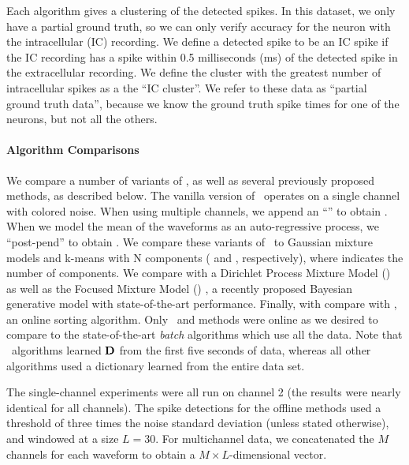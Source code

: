 Each algorithm gives a clustering of the detected spikes.  In this dataset, we only have a partial ground truth, so we can only verify accuracy for the neuron with the intracellular (IC) recording.  We define a detected spike to be an IC spike if the IC recording has a spike within 0.5 milliseconds (ms) of the detected spike in the extracellular recording.  We define the cluster with the greatest number of intracellular spikes as a the ``IC cluster''.   We refer to these data as ``partial ground truth data'', because we know the ground truth spike times for one of the neurons, but not all the others.  



\vspace{-.1in}
\paragraph{Algorithm Comparisons}

We compare a number of variants of \smug, as well as several previously proposed methods, as described below.  The vanilla version of \smug\ operates on a single channel with colored noise.  When using multiple channels, we append an ``'' to obtain \smug.  When we model the mean of the waveforms as an auto-regressive process, we ``post-pend'' to obtain \smug{}.  
We compare these variants of \smug\ to Gaussian mixture models and k-means \citep{Lewicki} with N components ( and , respectively), where  indicates the number of components.  We compare with a Dirichlet Process Mixture Model () \cite{WoodBla2008} as well as the  Focused Mixture Model () \cite{FMM}, a recently proposed Bayesian generative model with state-of-the-art performance.  Finally, with compare with  \cite{OSORT}, an online sorting algorithm.  Only \smug\ and  methods were online as we desired to compare to the state-of-the-art \emph{batch} algorithms which use all the data. 
Note that \smug\ algorithms learned $\mathbf{D}$ from the first five seconds of data, whereas all other algorithms used a dictionary learned from the entire data set.  

% 
% 
The single-channel experiments were all run on channel 2 (the results were nearly identical for all channels).  The spike detections for the offline methods used a threshold of three times the noise standard deviation \cite{Lewicki} (unless stated otherwise), and windowed at a size $L=30$.  For multichannel data, we concatenated the $M$ channels for each waveform to obtain a $M\times L$-dimensional vector.

